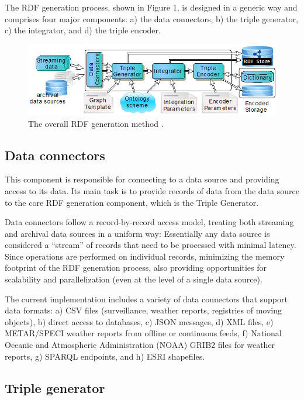 \documentclass{sig-alternate}
\makeatletter
\def\maxwidth#1{\ifdim\Gin@nat@width>#1 #1\else\Gin@nat@width\fi}
\makeatother
\begin{document}
The RDF generation process, shown in Figure 1, is designed in a generic way and comprises four major components: a) the data connectors, b) the triple generator, c) the integrator, and d) the triple encoder.
\begin{figure}[h!]
\centering
\includegraphics[width=\maxwidth{\columnwidth}]{./img/image1.png}
\cprotect\caption{  The overall RDF  generation  method .}
\label{}
\end{figure}


\subsection{Data connectors}

This component is responsible for connecting to a data source and providing access to its data. Its main task is to provide records of data from the data source to the core RDF generation component, which is the Triple Generator. 

Data connectors follow a record-by-record access model, treating both streaming and archival data sources in a uniform way: Essentially any data source is considered a ``stream'' of records that need to be processed with minimal latency. Since operations are performed on individual records, minimizing the memory footprint of the RDF generation process, also providing opportunities for scalability and parallelization (even at the level of a single data source).

The current implementation includes a variety of data connectors that support data formats: a) CSV files (surveillance, weather reports, registries of moving objects), b) direct access to databases, c) JSON messages, d) XML files, e) METAR/SPECI weather reports from offline or continuous feeds, f) National Oceanic and Atmospheric Administration (NOAA) GRIB2 files for weather reports, g) SPARQL endpoints, and h) ESRI shapefiles.

\subsection{Triple generator}
\end{document}
